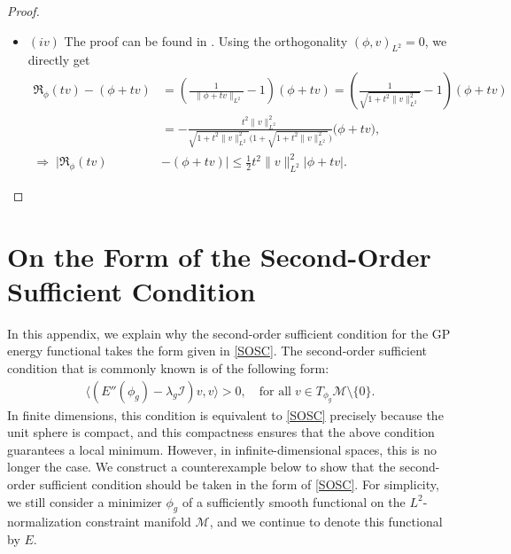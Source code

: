 \documentclass[preprint,3p]{elsarticle}
\begin{document}
\begin{proof}
\begin{itemize}[label={},left=0pt]
\begin{align*}
		\end{align*}
		\eqref{L-H1}, \eqref{L-I}, and \eqref{L-Orthogonalization-Coefficient}, the local Lipschitz continuity of $\lambda_{\phi}$ is proved
		\begin{align*}
			\big|\lambda_{\phi}-\lambda_{\psi}\big|\le C_{\phi}\|\phi-\psi\|_{L^p},
		\end{align*}
		where $p=\max\{p_0,p_1,p_2,2\}\in[1,6)$. 
		\item $(iv)$ The proof can be found in \cite[{\bf Lemma 4.3}]{2024On}.
		Using the orthogonality $(\phi,v)_{L^2}=0$, we directly get
		\begin{align}\label{c_n}
			\nonumber\mathfrak{R}_{\phi}(tv)-(\phi+tv)&=\left(\frac{1}{\;\;\|\phi+tv\|_{L^2}}-1\right)(\phi+tv)=\left(\frac{1}{\sqrt{1+t^2\|v\|^2_{L^2}}}-1\right)(\phi+tv)\\
			&=-\frac{t^2\|v\|^2_{L^2}}{\sqrt{1+t^2\|v\|^2_{L^2}}\Big(1+\sqrt{1+t^2\|v\|^2_{L^2}}\Big)}\big(\phi+tv\big),\\
			\nonumber	\Longrightarrow\;\big|\mathfrak{R}_{\phi}(tv)&-(\phi+tv)\big|\le\frac{1}{2}t^2\|v\|^2_{L^2}|\phi+tv|.
		\end{align}
	\end{itemize}
\end{proof}
\section{On the Form of the Second-Order Sufficient Condition}\label{Appendix-SOSC}
In this appendix, we explain why the second-order sufficient condition for the GP energy functional takes the form given in \eqref{SOSC}. The second-order sufficient condition that is commonly known is of the following form:
\begin{align*}
	\langle (E''(\phi_g) - \lambda_g \mathcal{I}) v, v \rangle > 0, \quad {\text{for all}}\; v \in T_{\phi_g}\mathcal{M} \setminus \{0\}.
\end{align*}
In finite dimensions, this condition is equivalent to \eqref{SOSC} precisely because the unit sphere is compact, and this compactness ensures that the above condition guarantees a local minimum. However, in infinite-dimensional spaces, this is no longer the case. We construct a counterexample below to show that the second-order sufficient condition should be taken in the form of \eqref{SOSC}. {For simplicity, we still consider a minimizer $\phi_g$ of a sufficiently smooth functional on the $L^2$-normalization constraint manifold $\mathcal{M}$, and we continue to denote this functional by $E$.}
\end{document}
